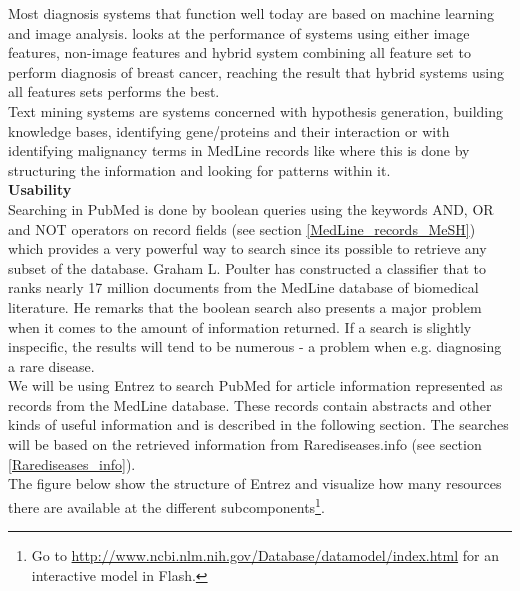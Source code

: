 Most diagnosis systems that function well today are based on machine
learning and image analysis. \cite{Wang1999115} looks at the
performance of systems using either image features, non-image features
and hybrid system combining all feature set to perform diagnosis of
breast cancer, reaching the result that hybrid systems using all
features sets performs the best.\\

Text mining systems are systems concerned with hypothesis generation,
building knowledge bases, identifying gene/proteins and their
interaction or with identifying malignancy terms in MedLine records
like \cite{AutomatedMalignancyRecognition} where this is done by
structuring the information and looking for patterns within it. \\

\textbf{Usability} \\ Searching in PubMed is done by boolean queries
using the keywords AND, OR and NOT operators on record fields (see
section \ref{MedLine_records_MeSH}) which provides a very powerful
way to search since its possible to retrieve any subset of the
database. Graham L. Poulter \cite{RapidClassification} has constructed
a classifier that to ranks nearly 17 million documents from the
MedLine database of biomedical literature. He remarks that the boolean
search also presents a major problem when it comes to the amount of
information returned. If a search is slightly inspecific, the results
will tend to be numerous - a problem when e.g. diagnosing a rare
disease.\\

We will be using Entrez to search PubMed for article information
represented as records from the MedLine database. These records
contain abstracts and other kinds of useful information and is
described in the following section. The searches will be based on the
retrieved information from Rarediseases.info
(see section \ref{Rarediseases_info}).  \\

The figure below show the structure of Entrez and visualize how many
resources there are available at the different
subcomponents\footnote{Go to
  \href{http://www.ncbi.nlm.nih.gov/Database/datamodel/index.html}{http://www.ncbi.nlm.nih.gov/Database/datamodel/index.html}
  for an interactive model in Flash.}.


